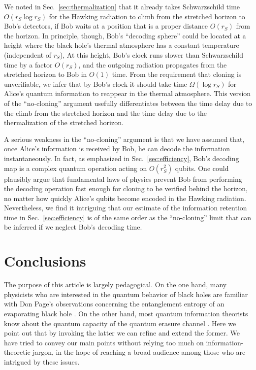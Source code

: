 \documentclass[11pt]{article}
\begin{document}
We noted in Sec.~\ref{sec:thermalization} that it already takes Schwarzschild time $O(r_S\log r_S)$ for the Hawking radiation to climb from the stretched horizon to Bob's detectors, if Bob waits at a position that is a proper distance $O(r_S)$ from the horizon. In principle, though, Bob's  ``decoding sphere'' could be located at a height where the black hole's thermal atmosphere has a constant temperature (independent of $r_S$), At this height, Bob's clock runs slower than Schwarzschild time by a factor $O(r_S)$, and the outgoing radiation propagates from the stretched horizon to Bob in $O(1)$ time. From the requirement that cloning is unverifiable, we infer that by Bob's clock it should take time $\Omega(\log r_S)$ for Alice's quantum information to reappear in the thermal atmosphere. This version of the ``no-cloning'' argument usefully differentiates between the time delay due to the climb from the stretched horizon and the time delay due to the thermalization of the stretched horizon.

A serious weakness in the ``no-cloning'' argument is that we have assumed that, once Alice's information is received by Bob, he can decode the information instantaneously. In fact, as emphasized in Sec.~\ref{sec:efficiency}, Bob's decoding map is a complex quantum operation acting on $O(r_S^2)$ qubits. One could plausibly argue that fundamental laws of physics prevent Bob from performing the decoding operation fast enough for cloning to be verified behind the horizon, no matter how quickly Alice's qubits become encoded in the Hawking radiation. Nevertheless, we find it intriguing that our estimate of the information retention time in Sec.~\ref{sec:efficiency} is of the same order as the ``no-cloning'' limit that can be inferred if we neglect Bob's decoding time.

\section{Conclusions}
The purpose of this article is largely pedagogical. On the one hand, many physicists who are interested in the quantum behavior of black holes are familiar with Don Page's observations concerning the entanglement entropy of an evaporating black hole \cite{page-entropy}. On the other hand, most quantum information theorists know about the quantum capacity of the quantum erasure channel \cite{thapliyal,quantum-erasure}. Here we point out that by invoking the latter we can refine and extend the former. We have tried to convey our main points without relying too much on information-theoretic jargon, in the hope of reaching a broad audience among those who are intrigued by these issues.
\end{document}
